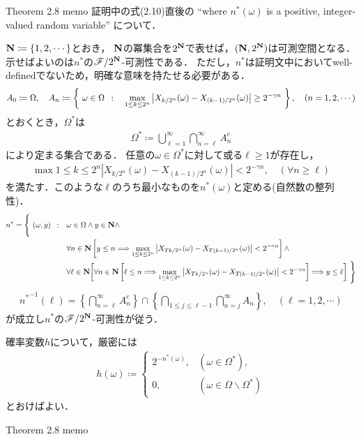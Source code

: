	\begin{itembox}[l]{Theorem 2.8 memo}
		証明中の式(2.10)直後の
		``where $n^*(\omega)$ is a positive, integer-valued random variable''
		について．
	\end{itembox}
	
	\begin{prf}
		$\mathbf{N} \coloneqq \{1,2,\cdots\}$とおき，
		$\mathbf{N}$の冪集合を$2^{\mathbf{N}}$で表せば，$(\mathbf{N},2^{\mathbf{N}})$は可測空間となる．
		示せばよいのは$n^*$の$\mathscr{F}/2^{\mathbf{N}}$-可測性である．
		ただし，$n^*$は証明文中においてwell-definedでないため，明確な意味を持たせる必要がある．
		\begin{align}
			A_0 \coloneqq \Omega,
			\quad A_n \coloneqq \left\{\ \omega \in \Omega\ \, : \quad \operatorname*{max}_{1 \leq k \leq 2^n} \left| X_{k/2^n}(\omega) - X_{(k-1)/2^n}(\omega) \right| \geq 2^{-\gamma n}\ \right\},
			\quad (n=1,2,\cdots)
		\end{align}
		とおくとき，$\Omega^*$は
		\begin{align}
			\Omega^* \coloneqq \bigcup_{\ell =1}^{\infty} \bigcap_{n = \ell}^\infty A_n^c
		\end{align}
		により定まる集合である．
		任意の$\omega \in \Omega^*$に対して或る$\ell \geq 1$が存在し，
		\begin{align}
			\max{1 \leq k \leq 2^n}{\left| X_{k/2^n}(\omega) - X_{(k-1)/2^n}(\omega) \right|} < 2^{-\gamma n},
			\quad (\forall n \geq \ell)
		\end{align}
		を満たす．このような$\ell$のうち最小なものを$n^*(\omega)$と定める(自然数の整列性)．
		\begin{align}
			n^* = \Biggl\{\ (\omega,y)\ \, : \quad &\omega \in \Omega \wedge y \in \mathbf{N} \wedge \Biggr.\\
			&\forall n \in \mathbf{N}\left[y \leq n \Longrightarrow \operatorname*{max}_{1 \leq k \leq 2^n}\left|X_{Tk/2^n}(\omega) - X_{T(k-1)/2^n}(\omega)\right| < 2^{-\gamma n}\right] \wedge \\
			&\forall \ell \in \mathbf{N}
			\Biggl. \left[\forall n \in \mathbf{N}\left[\ell \leq n \Longrightarrow \operatorname*{max}_{1 \leq k \leq 2^n}\left|X_{Tk/2^n}(\omega) - X_{T(k-1)/2^n}(\omega)\right| < 2^{-\gamma n}\right] \Longrightarrow y \leq \ell\right]\ \Biggr\}
		\end{align}
		\begin{align}
			{n^*}^{-1}(\ell) = \left\{ \bigcap_{n = \ell}^\infty A_n^c \right\} \cap \left\{ \bigcap_{1 \leq j \leq \ell-1} \bigcap_{n = j}^\infty A_n \right\},
			\quad (\ell =1,2,\cdots)
		\end{align}
		が成立し$n^*$の$\mathscr{F}/2^{\mathbf{N}}$-可測性が従う．
		\QED
	\end{prf}
	
	確率変数$h$について，厳密には
	\begin{align}
		h(\omega) \coloneqq 
		\begin{cases}
			2^{-n^*(\omega)}, & (\omega \in \Omega^*), \\
			0, & (\omega \in \Omega \backslash \Omega^*)
		\end{cases}
	\end{align}
	とおけばよい．
	
	\begin{itembox}[l]{Theorem 2.8 memo}
	\end{itembox}